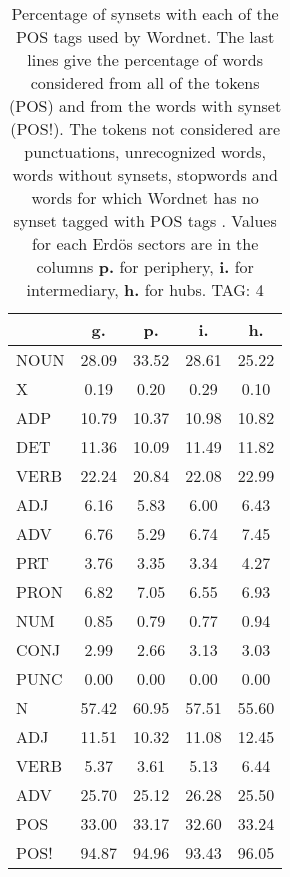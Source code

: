 \begin{table}[h!]
\begin{center}
\begin{tabular}{| l || c | c | c | c |}\hline
 & {\bf g.} & {\bf p.} & {\bf i.} & {\bf h.} \\\hline\hline
NOUN & 28.09  & 33.52  & 28.61  & 25.22 \\
X & 0.19  & 0.20  & 0.29  & 0.10 \\\hline
ADP & 10.79  & 10.37  & 10.98  & 10.82 \\
DET & 11.36  & 10.09  & 11.49  & 11.82 \\\hline
VERB & 22.24  & 20.84  & 22.08  & 22.99 \\\hline
ADJ & 6.16  & 5.83  & 6.00  & 6.43 \\
ADV & 6.76  & 5.29  & 6.74  & 7.45 \\\hline
PRT & 3.76  & 3.35  & 3.34  & 4.27 \\
PRON & 6.82  & 7.05  & 6.55  & 6.93 \\
NUM & 0.85  & 0.79  & 0.77  & 0.94 \\
CONJ & 2.99  & 2.66  & 3.13  & 3.03 \\
PUNC & 0.00  & 0.00  & 0.00  & 0.00 \\\hline\hline\hline
N & 57.42  & 60.95  & 57.51  & 55.60 \\\hline
ADJ & 11.51  & 10.32  & 11.08  & 12.45 \\\hline
VERB & 5.37  & 3.61  & 5.13  & 6.44 \\\hline
ADV & 25.70  & 25.12  & 26.28  & 25.50 \\\hline\hline
POS & 33.00  & 33.17  & 32.60  & 33.24 \\\hline
POS! & 94.87  & 94.96  & 93.43  & 96.05 \\\hline
\end{tabular}
\caption{Percentage of synsets with each of the POS tags used by Wordnet. The last lines give the percentage of words considered from all of the tokens (POS) and from the words with synset (POS!). The tokens not considered are punctuations, unrecognized words, words without synsets, stopwords and words for which Wordnet has no synset  tagged with POS tags . Values for each Erd\"os sectors are in the columns {{\bf p.}} for periphery, {{\bf i.}} for intermediary, {{\bf h.}} for hubs. TAG: 4}
\end{center}
\end{table}